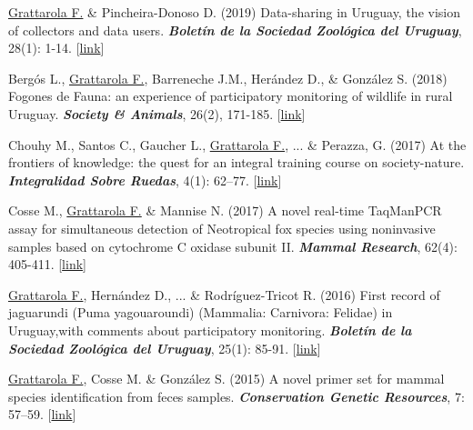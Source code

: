 \documentclass[9pt]{developercv} %
\begin{document}
\begin{etaremune}
\item \underline{Grattarola F.} \& Pincheira-Donoso D. (2019) Data-sharing in Uruguay, the vision of collectors and data users. \textit{\textbf{Boletín de la Sociedad Zoológica del Uruguay}}, 28(1): 1-14. [\href{https://doi.org/10.26462/28.1.1}{link}]

\item Bergós L., \underline{Grattarola F.}, Barreneche J.M., Herández D., \& González S. (2018) Fogones de Fauna: an experience of participatory monitoring of wildlife in rural Uruguay. \textit{\textbf{Society \& Animals}}, 26(2), 171-185. [\href{https://doi.org/10.1163/15685306-12341497}{link}]

\item Chouhy M., Santos C., Gaucher L., \underline{Grattarola F.}, ... \& Perazza, G. (2017) At the frontiers of knowledge: the quest for an integral training course on society-nature. \textit{\textbf{Integralidad Sobre Ruedas}}, 4(1): 62–77. [\href{https://ojs.fhce.edu.uy/index.php/insoru/article/view/234}{link}]

\item Cosse M., \underline{Grattarola F.}  \& Mannise N. (2017) A novel real-time TaqMan\texttrademark PCR assay for simultaneous detection of Neotropical fox species using noninvasive samples based on cytochrome C oxidase subunit II. \textit{\textbf{Mammal Research}}, 62(4): 405-411. [\href{https://doi.org/10.1007/s13364-017-0328-y}{link}]

\item \underline{Grattarola F.}, Hernández D., ... \& Rodríguez-Tricot R. (2016) First record of jaguarundi (Puma yagouaroundi) (Mammalia: Carnivora: Felidae) in Uruguay,with comments about  participatory monitoring. \textit{\textbf{Boletín de la Sociedad Zoológica del Uruguay}}, 25(1): 85-91. [\href{http://szu.org.uy/journal/index.php/Bol_SZU/article/view/23}{link}]

\item \underline{Grattarola F.}, Cosse M. \& González S. (2015) A novel primer set for mammal species identification from feces samples. \textit{\textbf{Conservation Genetic Resources}}, 7: 57–59. [\href{https://doi.org/10.1007/s12686-014-0359-5}{link}]

\end{etaremune}


\end{document}
